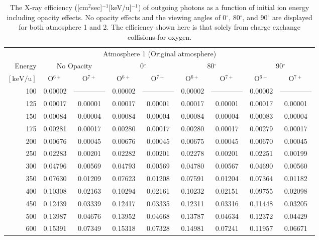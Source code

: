 \begin{table}[ht]
    \centering
    \caption{The X-ray efficiency ([cm$^2$sec]$^{-1}$[keV/u]$^{-1}$) of outgoing photons as a function of initial ion energy including opacity effects. No opacity effects and the viewing angles of 0$^\circ$, 80$^\circ$, and 90$^\circ$ are displayed for both atmosphere 1 and 2. The efficiency shown here is that solely from charge exchange collisions for oxygen.}
    \begin{tabular}{r|c|c|c|c|c|c|c|c}
    \multicolumn{9}{c}{Atmosphere 1 (Original atmosphere)} \\ \cline{2-9}
    Energy & \multicolumn{2}{c|}{No Opacity} & \multicolumn{2}{c|}{0$^\circ$} & \multicolumn{2}{c|}{80$^\circ$} & \multicolumn{2}{c}{90$^\circ$} \\ \cline{2-9}
    $\mathrm{[keV/u]}$ & O$^{6+}$ & O$^{7+}$ & O$^{6+}$ & O$^{7+}$ & O$^{6+}$ & O$^{7+}$ & O$^{6+}$ & O$^{7+}$ \\ \cline{1-9}
      100 & 0.00002 & -------------- & 0.00002 & -------------- & 0.00002 & -------------- & 0.00002 & -------------- \\
      125 & 0.00017 & 0.00001 & 0.00017 & 0.00001 & 0.00017 & 0.00001 & 0.00017 & 0.00001 \\
      150 & 0.00084 & 0.00004 & 0.00084 & 0.00004 & 0.00084 & 0.00004 & 0.00083 & 0.00004 \\
      175 & 0.00281 & 0.00017 & 0.00280 & 0.00017 & 0.00280 & 0.00017 & 0.00279 & 0.00017 \\
      200 & 0.00676 & 0.00045 & 0.00676 & 0.00045 & 0.00675 & 0.00045 & 0.00670 & 0.00045 \\
      250 & 0.02283 & 0.00201 & 0.02282 & 0.00201 & 0.02278 & 0.00201 & 0.02251 & 0.00199 \\
      300 & 0.04796 & 0.00569 & 0.04793 & 0.00569 & 0.04780 & 0.00567 & 0.04690 & 0.00560 \\
      350 & 0.07630 & 0.01209 & 0.07623 & 0.01208 & 0.07591 & 0.01204 & 0.07364 & 0.01182 \\
      400 & 0.10308 & 0.02163 & 0.10294 & 0.02161 & 0.10232 & 0.02151 & 0.09755 & 0.02098 \\
      450 & 0.12439 & 0.03339 & 0.12417 & 0.03335 & 0.12311 & 0.03316 & 0.11448 & 0.03205 \\
      500 & 0.13987 & 0.04676 & 0.13952 & 0.04668 & 0.13787 & 0.04634 & 0.12372 & 0.04429 \\
      600 & 0.15391 & 0.07349 & 0.15318 & 0.07328 & 0.14981 & 0.07241 & 0.11957 & 0.06671 \\

\end{tabular}
\end{table}
